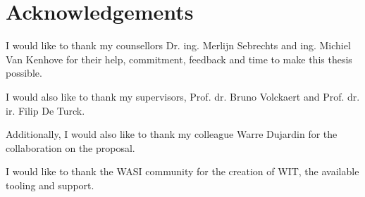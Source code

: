 \chapter*{Acknowledgements}
I would like to thank my counsellors Dr. ing. Merlijn Sebrechts and ing. Michiel Van Kenhove for their help, commitment, feedback and time to make this thesis possible.

I would also like to thank my supervisors, Prof. dr. Bruno Volckaert and Prof. dr. ir. Filip De Turck.

Additionally, I would also like to thank my colleague Warre Dujardin for the collaboration on the proposal.

I would like to thank the WASI community for the creation of WIT, the available tooling and support.